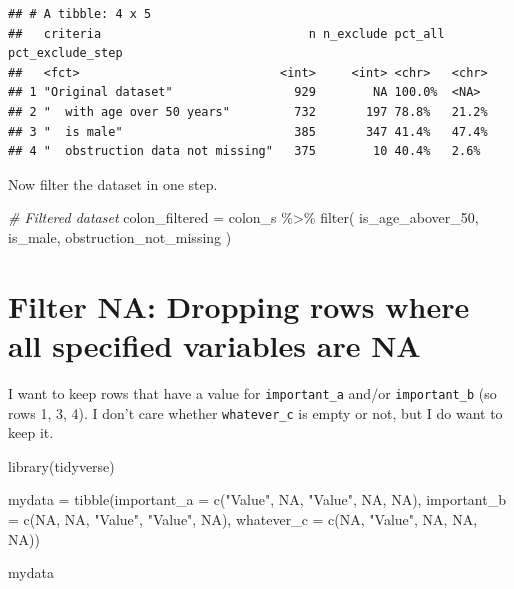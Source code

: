 \documentclass[
]{book}
\newenvironment{Shaded}{\begin{snugshade}}{\end{snugshade}}
\newcommand{\AttributeTok}[1]{\textcolor[rgb]{0.77,0.63,0.00}{#1}}
\newcommand{\CommentTok}[1]{\textcolor[rgb]{0.56,0.35,0.01}{\textit{#1}}}
\newcommand{\ConstantTok}[1]{\textcolor[rgb]{0.00,0.00,0.00}{#1}}
\newcommand{\FunctionTok}[1]{\textcolor[rgb]{0.00,0.00,0.00}{#1}}
\newcommand{\NormalTok}[1]{#1}
\newcommand{\OtherTok}[1]{\textcolor[rgb]{0.56,0.35,0.01}{#1}}
\newcommand{\SpecialCharTok}[1]{\textcolor[rgb]{0.00,0.00,0.00}{#1}}
\newcommand{\StringTok}[1]{\textcolor[rgb]{0.31,0.60,0.02}{#1}}
\begin{document}
\begin{verbatim}
## # A tibble: 4 x 5
##   criteria                             n n_exclude pct_all pct_exclude_step
##   <fct>                            <int>     <int> <chr>   <chr>           
## 1 "Original dataset"                 929        NA 100.0%  <NA>            
## 2 "  with age over 50 years"         732       197 78.8%   21.2%           
## 3 "  is male"                        385       347 41.4%   47.4%           
## 4 "  obstruction data not missing"   375        10 40.4%   2.6%
\end{verbatim}

Now filter the dataset in one step.

\begin{Shaded}
\begin{Highlighting}[]
\CommentTok{\# Filtered dataset}
\NormalTok{colon\_filtered }\OtherTok{=}\NormalTok{ colon\_s }\SpecialCharTok{\%\textgreater{}\%} 
  \FunctionTok{filter}\NormalTok{(}
\NormalTok{    is\_age\_abover\_50,}
\NormalTok{    is\_male,}
\NormalTok{    obstruction\_not\_missing}
\NormalTok{  )}
\end{Highlighting}
\end{Shaded}

\hypertarget{filter-na-dropping-rows-where-all-specified-variables-are-na}{%
\section{Filter NA: Dropping rows where all specified variables are NA}\label{filter-na-dropping-rows-where-all-specified-variables-are-na}}

I want to keep rows that have a value for \texttt{important\_a} and/or \texttt{important\_b} (so rows 1, 3, 4).
I don't care whether \texttt{whatever\_c} is empty or not, but I do want to keep it.

\begin{Shaded}
\begin{Highlighting}[]
\FunctionTok{library}\NormalTok{(tidyverse)}

\NormalTok{mydata  }\OtherTok{=} \FunctionTok{tibble}\NormalTok{(}\AttributeTok{important\_a =} \FunctionTok{c}\NormalTok{(}\StringTok{"Value"}\NormalTok{, }\ConstantTok{NA}\NormalTok{, }\StringTok{"Value"}\NormalTok{, }\ConstantTok{NA}\NormalTok{, }\ConstantTok{NA}\NormalTok{),}
                 \AttributeTok{important\_b =} \FunctionTok{c}\NormalTok{(}\ConstantTok{NA}\NormalTok{, }\ConstantTok{NA}\NormalTok{, }\StringTok{"Value"}\NormalTok{, }\StringTok{"Value"}\NormalTok{, }\ConstantTok{NA}\NormalTok{),}
                 \AttributeTok{whatever\_c  =} \FunctionTok{c}\NormalTok{(}\ConstantTok{NA}\NormalTok{, }\StringTok{"Value"}\NormalTok{, }\ConstantTok{NA}\NormalTok{, }\ConstantTok{NA}\NormalTok{, }\ConstantTok{NA}\NormalTok{))}

\NormalTok{mydata}
\end{Highlighting}
\end{Shaded}
\end{document}
